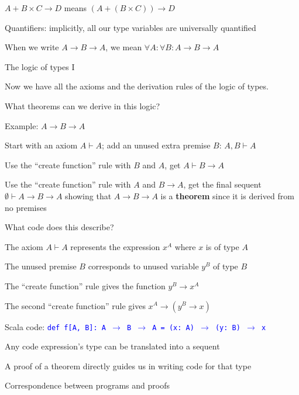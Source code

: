 $A+B\times C\rightarrow D$ means $\left(A+\left(B\times C\right)\right)\rightarrow D$

Quantifiers: implicitly, all our type variables are universally quantified

When we write $A\rightarrow B\rightarrow A$, we mean $\forall A:\forall B:A\rightarrow B\rightarrow A$

The logic of types I

Now we have all the axioms and the derivation rules of the logic of
types.

What theorems can we derive in this logic?

Example: $A\rightarrow B\rightarrow A$

Start with an axiom $A\vdash A$; add an unused extra premise $B$:
$A,B\vdash A$

Use the \textsf{``}create function\textsf{''} rule with $B$ and $A$, get $A\vdash B\rightarrow A$

Use the \textsf{``}create function\textsf{''} rule with $A$ and $B\rightarrow A$,
get the final sequent $\emptyset\vdash A\rightarrow B\rightarrow A$
showing that $A\rightarrow B\rightarrow A$ is a \textbf{theorem}
since it is derived from no premises

What code does this describe?

The axiom $A\vdash A$ represents the expression $x^{A}$ where $x$
is of type $A$

The unused premise $B$ corresponds to unused variable $y^{B}$ of
type $B$

The \textsf{``}create function\textsf{''} rule gives the function $y^{B}\rightarrow x^{A}$

The second \textsf{``}create function\textsf{''} rule gives $x^{A}\rightarrow\left(y^{B}\rightarrow x\right)$

Scala code: \texttt{\textcolor{blue}{\footnotesize{}def f{[}A, B{]}:\ A
$\rightarrow$ B $\rightarrow$ A = (x:\ A) $\rightarrow$ (y:\ B)
$\rightarrow$ x}}{\footnotesize\par}

Any code expression\textsf{'}s type can be translated into a sequent

A proof of a theorem directly guides us in writing code for that type

Correspondence between programs and proofs

